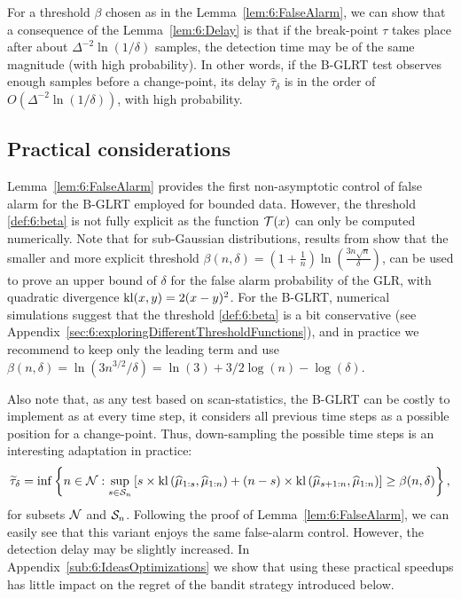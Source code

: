 For a threshold $\beta$ chosen as in the Lemma~\ref{lem:6:FalseAlarm}, we can show that a consequence of the Lemma~\ref{lem:6:Delay} is that if the break-point $\tau$ takes place after about $\Delta^{-2} \ln(1/\delta)$ samples, the detection time may be of the same magnitude (with high probability).
%
In other words, if the B-GLRT test observes enough samples before a change-point,
its delay $\widehat{\tau}_\delta$ is in the order of $O(\Delta^{-2} \ln(1/\delta))$, with high probability.


\subsection{Practical considerations}\label{sub:6:PracticalConsiderations}

Lemma~\ref{lem:6:FalseAlarm} provides the first non-asymptotic control of false alarm for the B-GLRT employed for bounded data. However, the threshold \eqref{def:6:beta} is not fully explicit as the function $\mathcal{T}(x)$ can only be computed numerically.
Note that for sub-Gaussian distributions, results from \cite{Maillard2018GLR} show that the smaller and more explicit threshold
$\beta(n,\delta) = \left(1 + \frac{1}{n}\right)\ln\left(\frac{3n\sqrt{n}}{\delta}\right)$,
can be used to prove an upper bound of $\delta$ for the false alarm probability of the GLR, with quadratic divergence $\mathrm{kl}(x,y)=2(x-y)^2$.
%
For the B-GLRT, numerical simulations suggest that the threshold \eqref{def:6:beta} is a bit conservative (see Appendix~\ref{sec:6:exploringDifferentThresholdFunctions}), and in practice we recommend to keep only the leading term and use $\beta(n,\delta) = \ln(3n^{3/2}/\delta) = \ln(3) + 3/2\log(n) - \log(\delta)$.

Also note that, as any test based on scan-statistics, the B-GLRT can be costly to implement as at every time step, it considers all previous time steps as a possible position for a change-point.
Thus, down-sampling the possible time steps is an interesting adaptation in practice:
%
\begin{equation}\label{def:6:GLRTricks}
    \widetilde{\tau}_{\delta} = \inf \left\{ n \in \mathcal{N} : \sup_{s \in \mathcal{S}_n} \left[s \times \mathrm{kl}\left(\widehat{\mu}_{1:s},\widehat{\mu}_{1:n}\right) + (n-s) \times \mathrm{kl}\left(\widehat{\mu}_{s+1:n},\widehat{\mu}_{1:n}\right)\right] \geq \beta(n,\delta)\right\},
\end{equation}
%
for subsets $\mathcal{N}$ and $\mathcal{S}_n$. Following the proof of Lemma~\ref{lem:6:FalseAlarm}, we can easily see that this variant enjoys the same false-alarm control.
However, the detection delay may be slightly increased.
In Appendix~\ref{sub:6:IdeasOptimizations} we show that using these practical speedups
has little impact on the regret of the bandit strategy introduced below.



